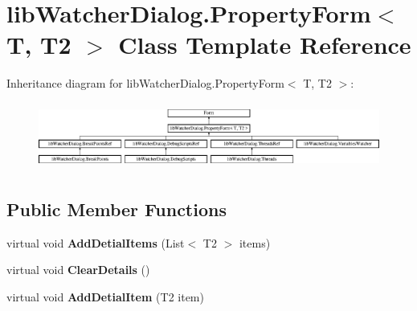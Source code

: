 \hypertarget{classlib_watcher_dialog_1_1_property_form_3_01_t_00_01_t2_01_4}{\section{lib\+Watcher\+Dialog.\+Property\+Form$<$ T, T2 $>$ Class Template Reference}
\label{classlib_watcher_dialog_1_1_property_form_3_01_t_00_01_t2_01_4}
}
Inheritance diagram for lib\+Watcher\+Dialog.\+Property\+Form$<$ T, T2 $>$\+:\begin{figure}[H]
\begin{center}
\leavevmode
\includegraphics[height=2.222222cm]{classlib_watcher_dialog_1_1_property_form_3_01_t_00_01_t2_01_4}
\end{center}
\end{figure}
\subsection*{Public Member Functions}
\begin{DoxyCompactItemize}
\item 
\hypertarget{classlib_watcher_dialog_1_1_property_form_3_01_t_00_01_t2_01_4_a416124f37c48b02363bc53a2dc9faa9e}{virtual void {\bfseries Add\+Detial\+Items} (List$<$ T2 $>$ items)}\label{classlib_watcher_dialog_1_1_property_form_3_01_t_00_01_t2_01_4_a416124f37c48b02363bc53a2dc9faa9e}

\item 
\hypertarget{classlib_watcher_dialog_1_1_property_form_3_01_t_00_01_t2_01_4_af91dd8160dd737b6aa569b3b4b061d33}{virtual void {\bfseries Clear\+Details} ()}\label{classlib_watcher_dialog_1_1_property_form_3_01_t_00_01_t2_01_4_af91dd8160dd737b6aa569b3b4b061d33}

\item 
\hypertarget{classlib_watcher_dialog_1_1_property_form_3_01_t_00_01_t2_01_4_aecdea3d32b79c7be194b8f38a0f89b49}{virtual void {\bfseries Add\+Detial\+Item} (T2 item)}\label{classlib_watcher_dialog_1_1_property_form_3_01_t_00_01_t2_01_4_aecdea3d32b79c7be194b8f38a0f89b49}

\end{DoxyCompactItemize}
